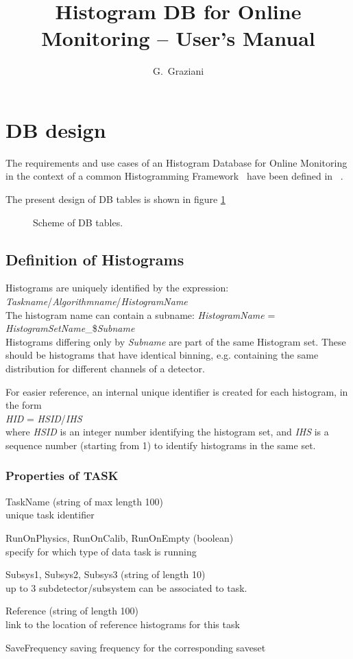 \documentclass{lhcbnote}
\title{Histogram DB for Online Monitoring -- User's Manual}
\author{G.~Graziani}
\begin{document}
\maketitle


\section{DB design}
The requirements and use cases of an Histogram Database for Online
Monitoring in the context of a common Histogramming Framework~\cite{genhisto}
have been defined in ~\cite{dbdesign}.

The present design of DB tables is shown in figure \ref{DBschema}


\begin{figure}[htb]
\centerline{}
\caption{Scheme of DB tables. }
\label{DBschema}
\end{figure}

\subsection{Definition of Histograms}
Histograms are uniquely identified by the expression:\\
{\it Taskname}/{\it Algorithmname}/{\it HistogramName}\\
The histogram name can contain a subname:
{\it HistogramName} = {\it HistogramSetName}\_\${\it Subname} \\
Histograms differing only by {\it Subname} are part of the same
Histogram set. These should be histograms that have identical binning,
e.g. containing the same distribution for different channels of a detector.

For easier reference, an internal unique identifier is created for
each histogram, in the form\\
{\it HID} = {\it HSID}/{\it IHS}\\
where {\it HSID} is an integer number identifying the histogram set,
and {\it IHS} is a sequence number (starting from 1) to identify histograms in
the same set.

\subsubsection{Properties of TASK} 
\begin{description}
\item{TaskName} (string of max length 100) \\
unique task identifier
\item{RunOnPhysics, RunOnCalib, RunOnEmpty} (boolean)\\
specify for which type of data task is running 
\item{Subsys1, Subsys2, Subsys3} (string of length 10)\\
up to 3 subdetector/subsystem can be associated to task. 
\item{Reference}  (string of length 100)\\
link to the location of reference histograms for this task
\item{SaveFrequency} saving frequency for the corresponding saveset
\end{description} 
\end{document}
